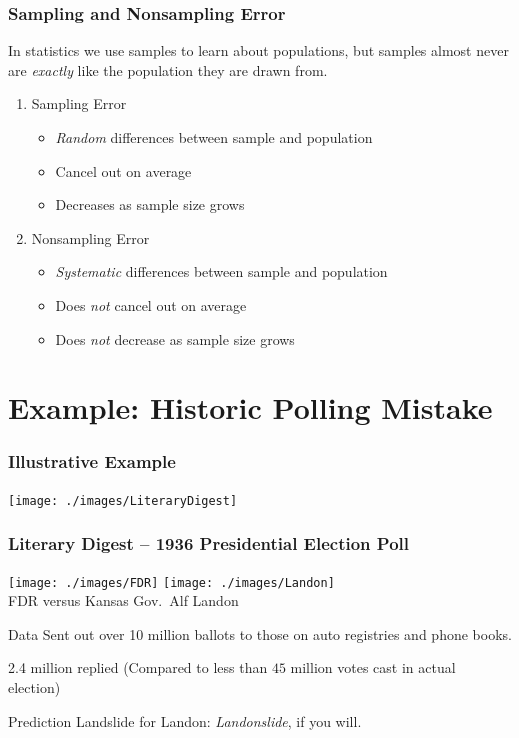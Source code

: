 \documentclass{beamer}
\begin{document}
\begin{frame}
\frametitle{Sampling and Nonsampling Error}
In statistics we use samples to learn about populations, but samples almost never are \emph{exactly} like the population they are drawn from.
	\begin{enumerate}
		\item Sampling Error 
			\begin{itemize}
				\item \emph{Random} differences between sample and population
				\item Cancel out on average
				\item Decreases as sample size grows
			\end{itemize}
		\item Nonsampling Error
			\begin{itemize}
				\item \emph{Systematic} differences between sample and population 
				\item Does \emph{not} cancel out on average
				\item Does \emph{not} decrease as sample size grows
			\end{itemize}
	\end{enumerate}
\end{frame}

\section{Example: Historic Polling Mistake}
\begin{frame}
\frametitle{Illustrative Example}
	\begin{center}
		\texttt{[image: ./images/LiteraryDigest]}
	\end{center}
\end{frame}

\begin{frame}
\frametitle{Literary Digest -- 1936 Presidential Election Poll}
	\begin{center}
		\texttt{[image: ./images/FDR]}
		\texttt{[image: ./images/Landon]}\\
		\small FDR versus Kansas Gov.\ Alf Landon
	\end{center}
	\normalsize

	\begin{block}{Data}
		Sent out over 10 million ballots to those on auto registries and phone books. 
		
		2.4 million replied (Compared to  less than $45$ million votes cast in actual election)
	\end{block}
	
	\begin{block}{Prediction}
		Landslide for Landon: \emph{Landonslide},  if you will.
	\end{block}
\end{frame}
\end{document}
